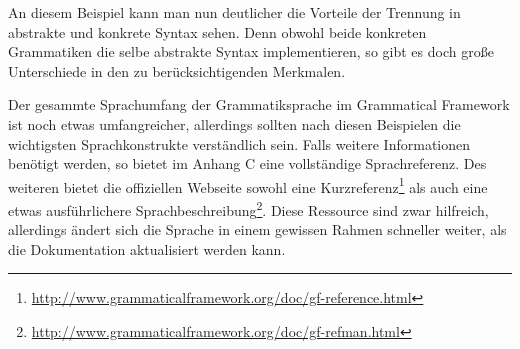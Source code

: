 \documentclass[12pt,abstract=on,titlepage,bibliography=totoc,ngerman,listof=totoc]{scrreprt}
\begin{document}
An diesem Beispiel kann man nun deutlicher die Vorteile der Trennung in abstrakte und konkrete Syntax sehen. Denn obwohl beide konkreten Grammatiken die selbe abstrakte Syntax implementieren, so gibt es doch große Unterschiede in den zu berücksichtigenden Merkmalen. \par
Der gesammte Sprachumfang der Grammatiksprache im Grammatical Framework ist noch etwas umfangreicher, allerdings sollten nach diesen Beispielen die wichtigsten Sprachkonstrukte verständlich sein. Falls weitere Informationen benötigt werden, so bietet \cite{RANTA2011} im Anhang C eine vollständige Sprachreferenz. Des weiteren bietet die offiziellen Webseite sowohl eine Kurzreferenz\footnote{\url{http://www.grammaticalframework.org/doc/gf-reference.html}} als auch eine etwas ausführlichere Sprachbeschreibung\footnote{\url{http://www.grammaticalframework.org/doc/gf-refman.html}}. Diese Ressource sind zwar hilfreich, allerdings ändert sich die Sprache in einem gewissen Rahmen schneller weiter, als die Dokumentation aktualisiert werden kann.
\FloatBarrier
\end{document}
